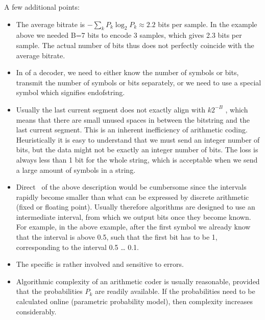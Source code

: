 \documentclass[letterpaper,10pt,english]{jupyterBook}
\begin{document}
\sphinxAtStartPar
A few additional points:
\begin{itemize}
\item {} 
\sphinxAtStartPar
The average bit\sphinxhyphen{}rate is \( -\sum_k P_k \log_2 P_k \approx 2.2
\) bits per sample. In the example above we needed B=7 bits to
encode 3 samples, which gives 2.3 bits per sample. The actual number
of bits thus does not perfectly coincide with the average bit\sphinxhyphen{}rate.

\item {} 
\sphinxAtStartPar
In  of a decoder,
we need to either know the number of symbols or bits, transmit the
number of symbols or bits separately, or we need to use a special
symbol which signifies end\sphinxhyphen{}of\sphinxhyphen{}string.

\item {} 
\sphinxAtStartPar
Usually the last current segment does not exactly align with
\(k2^{-B}\) , which means that there are small unused spaces
in between the bitstring and the last current segment. This is an
inherent inefficiency of arithmetic coding. Heuristically it is easy
to understand that we must send an integer number of bits, but the
data might not be exactly an integer number of bits. The loss is
always less than 1 bit for the whole string, which is acceptable
when we send a large amount of symbols in a string.

\item {} 
\sphinxAtStartPar
Direct  of
the above description would be cumbersome since the intervals
rapidly become smaller than what can be expressed by discrete
arithmetic (fixed or floating point). Usually therefore algorithms
are designed to use an intermediate interval, from which we output
bits once they become known. For example, in the above example,
after the first symbol we already know that the interval is above
0.5, such that the first bit has to be 1, corresponding to the
interval 0.5 … 0.1.

\item {} 
\sphinxAtStartPar
The specific 
is rather involved and sensitive to errors.

\item {} 
\sphinxAtStartPar
Algorithmic complexity of an arithmetic coder is usually reasonable,
provided that the probabilities \(P_{k}\) are readily
available. If the probabilities need to be calculated online
(parametric probability model), then complexity increases
considerably.

\end{itemize}
\end{document}
